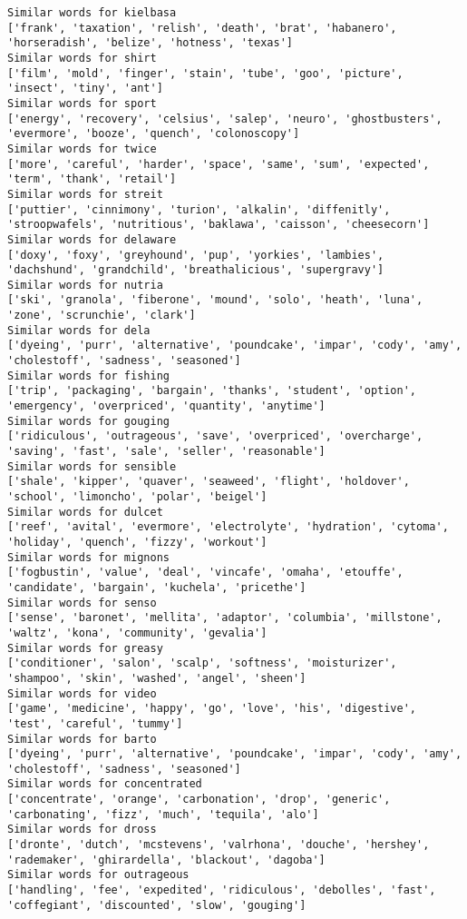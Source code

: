 \documentclass[11pt]{article}
\begin{document}
\begin{Verbatim}[commandchars=\\\{\}]
Similar words for kielbasa
['frank', 'taxation', 'relish', 'death', 'brat', 'habanero', 'horseradish', 'belize', 'hotness', 'texas']
Similar words for shirt
['film', 'mold', 'finger', 'stain', 'tube', 'goo', 'picture', 'insect', 'tiny', 'ant']
Similar words for sport
['energy', 'recovery', 'celsius', 'salep', 'neuro', 'ghostbusters', 'evermore', 'booze', 'quench', 'colonoscopy']
Similar words for twice
['more', 'careful', 'harder', 'space', 'same', 'sum', 'expected', 'term', 'thank', 'retail']
Similar words for streit
['puttier', 'cinnimony', 'turion', 'alkalin', 'diffenitly', 'stroopwafels', 'nutritious', 'baklawa', 'caisson', 'cheesecorn']
Similar words for delaware
['doxy', 'foxy', 'greyhound', 'pup', 'yorkies', 'lambies', 'dachshund', 'grandchild', 'breathalicious', 'supergravy']
Similar words for nutria
['ski', 'granola', 'fiberone', 'mound', 'solo', 'heath', 'luna', 'zone', 'scrunchie', 'clark']
Similar words for dela
['dyeing', 'purr', 'alternative', 'poundcake', 'impar', 'cody', 'amy', 'cholestoff', 'sadness', 'seasoned']
Similar words for fishing
['trip', 'packaging', 'bargain', 'thanks', 'student', 'option', 'emergency', 'overpriced', 'quantity', 'anytime']
Similar words for gouging
['ridiculous', 'outrageous', 'save', 'overpriced', 'overcharge', 'saving', 'fast', 'sale', 'seller', 'reasonable']
Similar words for sensible
['shale', 'kipper', 'quaver', 'seaweed', 'flight', 'holdover', 'school', 'limoncho', 'polar', 'beigel']
Similar words for dulcet
['reef', 'avital', 'evermore', 'electrolyte', 'hydration', 'cytoma', 'holiday', 'quench', 'fizzy', 'workout']
Similar words for mignons
['fogbustin', 'value', 'deal', 'vincafe', 'omaha', 'etouffe', 'candidate', 'bargain', 'kuchela', 'pricethe']
Similar words for senso
['sense', 'baronet', 'mellita', 'adaptor', 'columbia', 'millstone', 'waltz', 'kona', 'community', 'gevalia']
Similar words for greasy
['conditioner', 'salon', 'scalp', 'softness', 'moisturizer', 'shampoo', 'skin', 'washed', 'angel', 'sheen']
Similar words for video
['game', 'medicine', 'happy', 'go', 'love', 'his', 'digestive', 'test', 'careful', 'tummy']
Similar words for barto
['dyeing', 'purr', 'alternative', 'poundcake', 'impar', 'cody', 'amy', 'cholestoff', 'sadness', 'seasoned']
Similar words for concentrated
['concentrate', 'orange', 'carbonation', 'drop', 'generic', 'carbonating', 'fizz', 'much', 'tequila', 'alo']
Similar words for dross
['dronte', 'dutch', 'mcstevens', 'valrhona', 'douche', 'hershey', 'rademaker', 'ghirardella', 'blackout', 'dagoba']
Similar words for outrageous
['handling', 'fee', 'expedited', 'ridiculous', 'debolles', 'fast', 'coffegiant', 'discounted', 'slow', 'gouging']

\end{Verbatim}
\end{document}

